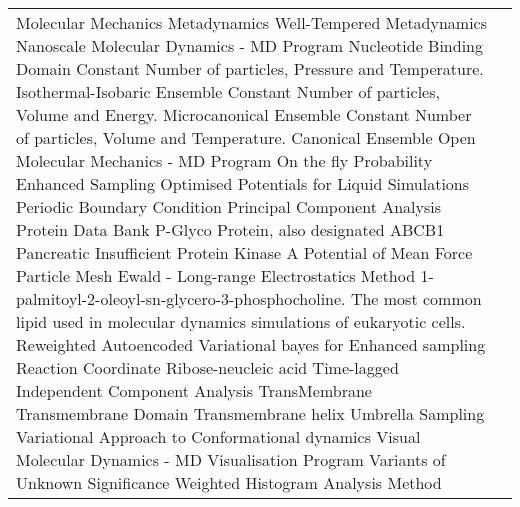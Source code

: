\begin{center}
\begin{bfseries}
\begin{longtable}{@{}p{3cm}@{}p{\dimexpr\textwidth-1cm\relax}@{}}
\nomenclature{${\small MM}$}       {Molecular Mechanics}
\nomenclature{${\small MetaD}$}    {Metadynamics}
\nomenclature{${\small WT-MetaD}$} {Well-Tempered Metadynamics}
\nomenclature{${\small NAMD}$}     {Nanoscale Molecular Dynamics - MD Program}
\nomenclature{${\small NBD}$}      {Nucleotide Binding Domain}
\nomenclature{${\small NPT}$}      {Constant Number of particles, Pressure and Temperature. Isothermal-Isobaric Ensemble}
\nomenclature{${\small NVE}$}      {Constant Number of particles, Volume and Energy. Microcanonical Ensemble}
\nomenclature{${\small NVT}$}      {Constant Number of particles, Volume and Temperature. Canonical Ensemble}
\nomenclature{${\small OpenMM}$}   {Open Molecular Mechanics - MD Program}
\nomenclature{${\small OPES}$}     {On the fly Probability Enhanced Sampling}
\nomenclature{${\small OPLS}$}     {Optimised Potentials for Liquid Simulations}
\nomenclature{${\small PBC}$}      {Periodic Boundary Condition}
\nomenclature{${\small PCA}$}      {Principal Component Analysis}
\nomenclature{${\small PDB}$}      {Protein Data Bank}
\nomenclature{${\small PGP}$}      {P-Glyco Protein, also designated ABCB1}
\nomenclature{${\small PI}$}       {Pancreatic Insufficient}
\nomenclature{${\small PKA}$}      {Protein Kinase A}
\nomenclature{${\small PMF}$}      {Potential of Mean Force}
\nomenclature{${\small PME}$}      {Particle Mesh Ewald - Long-range Electrostatics Method}
\nomenclature{${\small POPC}$}     {1-palmitoyl-2-oleoyl-sn-glycero-3-phosphocholine. The most common lipid used in molecular dynamics simulations of eukaryotic cells.}
\nomenclature{${\small RAVE}$}     {Reweighted Autoencoded Variational bayes for Enhanced sampling}
\nomenclature{${\small RC}$}       {Reaction Coordinate}
\nomenclature{${\small RNA}$}      {Ribose-neucleic acid}
\nomenclature{${\small TICA}$}     {Time-lagged Independent Component Analysis}
\nomenclature{${\small TM}$}       {TransMembrane}
\nomenclature{${\small TMD}$}      {Transmembrane Domain}
\nomenclature{${\small TMH}$}      {Transmembrane helix}
\nomenclature{${\small US}$}       {Umbrella Sampling}
\nomenclature{${\small VAC}$}      {Variational Approach to Conformational dynamics}
\nomenclature{${\small VMD}$}      {Visual Molecular Dynamics - MD Visualisation Program}
\nomenclature{${\small VUS}$}      {Variants of Unknown Significance}
\nomenclature{${\small WHAM}$}     {Weighted Histogram Analysis Method}
\end{longtable}
\end{bfseries}
\end{center}
